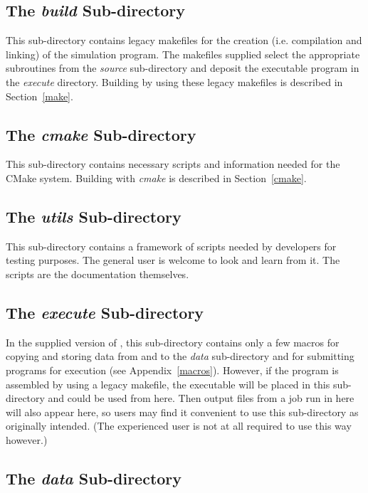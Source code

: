 \subsection{The {\em build} Sub-directory}

This sub-directory contains legacy makefiles for the
creation (i.e. compilation and linking) of the \D simulation
program.  The makefiles supplied select the appropriate
subroutines from the {\em source} sub-directory and deposit the
executable program in the {\em execute} directory.  Building \D
by using these legacy makefiles is described in Section~\ref{make}.

\subsection{The {\em cmake} Sub-directory}

This sub-directory contains necessary scripts and information
needed for the \D CMake system.  Building \D with {\sl cmake}
is described in Section~\ref{cmake}.

\subsection{The {\em utils} Sub-directory}

This sub-directory contains a framework of scripts needed by \D
developers for testing purposes.  The general user is welcome to
look and learn from it.  The scripts are the documentation themselves.

\subsection{The {\em execute} Sub-directory}

In the supplied version of \D, this sub-directory contains only a
few macros for copying and storing data from and to the {\em data}
sub-directory and for submitting programs for execution (see
Appendix~\ref{macros}).  However, if the \D program is assembled
by using a legacy makefile, the executable will be placed in this
sub-directory and could be used from here.  Then output files from
a job run in here will also appear here, so users may find it
convenient to use this sub-directory as originally intended.
(The experienced user is not at all required to use \D this way however.)

\subsection{The {\em data} Sub-directory}

